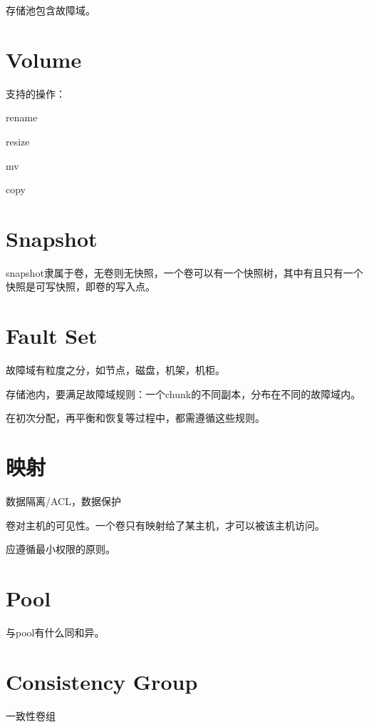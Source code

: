 存储池包含故障域。

\section{Volume}

支持的操作：
\begin{compactenum}
    \item rename
    \item resize 
    \item mv
    \item copy  
\end{compactenum}

\section{Snapshot}

snapshot隶属于卷，无卷则无快照，一个卷可以有一个快照树，其中有且只有一个快照是可写快照，即卷的写入点。

\section{Fault Set}

故障域有粒度之分，如节点，磁盘，机架，机柜。

存储池内，要满足故障域规则：一个chunk的不同副本，分布在不同的故障域内。\label{rule:faultset}

在初次分配，再平衡和恢复等过程中，都需遵循这些规则。

\section{映射}

数据隔离/ACL，数据保护

卷对主机的可见性。一个卷只有映射给了某主机，才可以被该主机访问。

应遵循最小权限的原则。

\section{Pool}

与pool有什么同和异。

\section{Consistency Group}

一致性卷组

